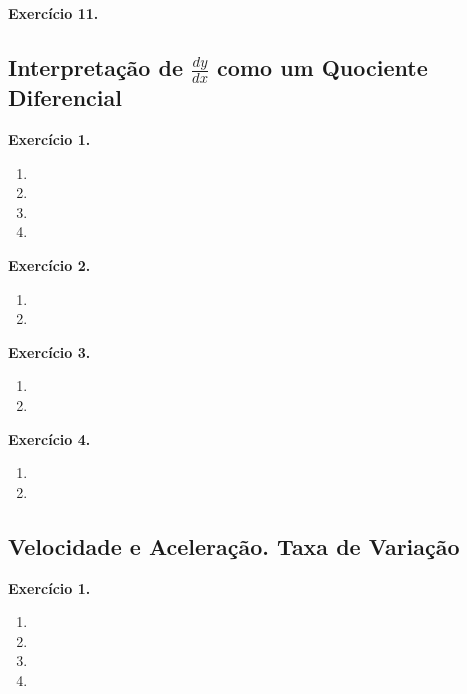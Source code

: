 \documentclass[12pt,a4paper]{article}
\begin{document}
\vspace{0.5cm}
\noindent\textbf{Exercício 11.}

\subsection{Interpretação de $\frac{dy}{dx}$ como um Quociente Diferencial}

\vspace{0.5cm}
\noindent\textbf{Exercício 1.}
\begin{enumerate}
    \renewcommand{\theenumi}{\alph{enumi}}
    \renewcommand{\labelenumi}{\theenumi)}
    \item 
    \item 
    \item 
    \item 
\end{enumerate}

\vspace{0.5cm}
\noindent\textbf{Exercício 2.}
\begin{enumerate}
    \renewcommand{\theenumi}{\alph{enumi}}
    \renewcommand{\labelenumi}{\theenumi)}
    \item 
    \item 
\end{enumerate}

\vspace{0.5cm}
\noindent\textbf{Exercício 3.}
\begin{enumerate}
    \renewcommand{\theenumi}{\alph{enumi}}
    \renewcommand{\labelenumi}{\theenumi)}
    \item 
    \item 
\end{enumerate}

\vspace{0.5cm}
\noindent\textbf{Exercício 4.}
\begin{enumerate}
    \renewcommand{\theenumi}{\alph{enumi}}
    \renewcommand{\labelenumi}{\theenumi)}
    \item 
    \item 
\end{enumerate}

\subsection{Velocidade e Aceleração. Taxa de Variação}

\vspace{0.5cm}
\noindent\textbf{Exercício 1.}
\begin{enumerate}
    \renewcommand{\theenumi}{\alph{enumi}}
    \renewcommand{\labelenumi}{\theenumi)}
    \item 
    \item 
    \item 
    \item 
\end{enumerate}
\end{document}
